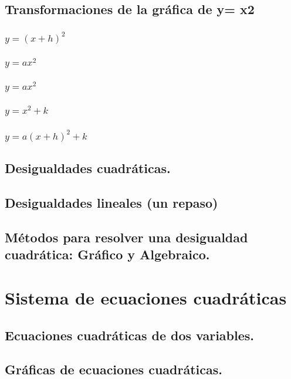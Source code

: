 \subsection{Transformaciones de la gráfica de y= x2}
\subsubsection{$y= (x+h)^2$}
\subsubsection{$y= ax^2$}
\subsubsection{$y=ax^2$}
\subsubsection{$y=x^2+k$}
\subsubsection{$y=a(x+h)^2+k$}
\subsection{Desigualdades cuadráticas.}
\subsection{Desigualdades lineales (un repaso)}
\subsection{Métodos para resolver una desigualdad cuadrática: Gráfico y Algebraico.}









\section{Sistema de ecuaciones cuadráticas} %

\subsection{Ecuaciones cuadráticas de dos variables.}
\subsection{Gráficas de ecuaciones cuadráticas.}
